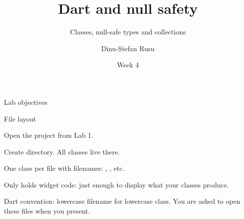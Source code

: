 \documentclass[10pt,aspectratio=169,t]{beamer}
\title{Dart and null safety}
\subtitle{Classes, null-safe types and collections}
\author{Dinu-Ștefan Rusu}
\date{Week 4}
\begin{document}
\titleframe

\begin{frame}[eyebrow=Today]{Lab objectives}
  \vskip 2mm
  \begin{grid}[2]
  \end{grid}
  \vskip 6mm
\end{frame}

\begin{frame}[fragile,eyebrow=Setup]{File layout}
  \begin{steps}
    \item Open the project from Lab 1.
    \item Create  directory. All classes live there.
    \item One class per file with  filenames: , , etc.
    \item Only  holds widget code: just enough to display what your classes produce.
  \end{steps}
  \begin{hint}
    Dart convention: lowercase filename for lowercase class. You are asked to open these files when you present.
  \end{hint}
\end{frame}
\end{document}
